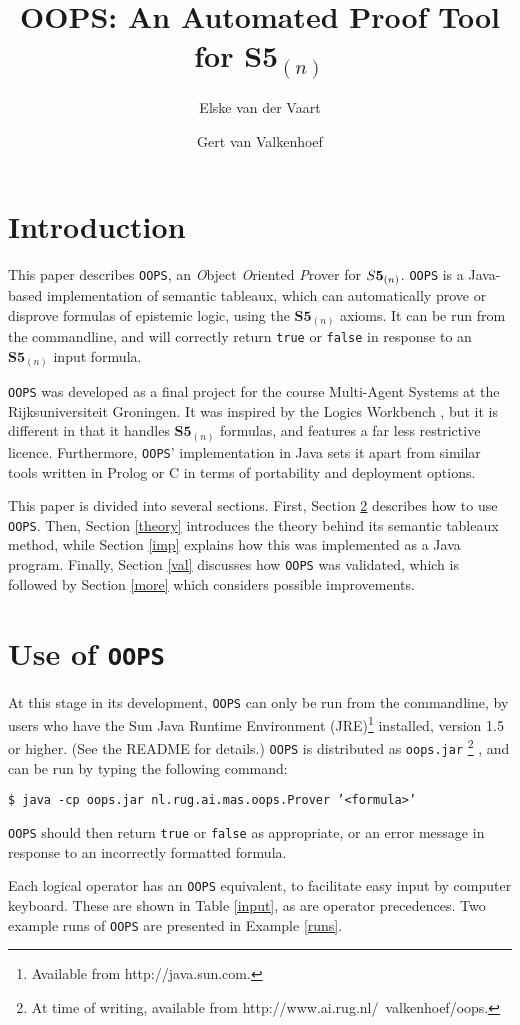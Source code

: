 \documentclass[11pt,a4paper]{article}
\author{Elske van der Vaart \and Gert van Valkenhoef}
\title{OOPS: An Automated Proof Tool for $\textbf{S5}_{(n)}$}
\begin{document}
\maketitle

\section{Introduction}

This paper describes {\tt OOPS}, an {\it O}bject {\it O}riented {\it P}rover for $\mathbf\mathit{S}\textbf{5}_{(n)}$. {\tt OOPS} is a Java-based implementation of semantic tableaux, which can automatically prove or disprove  formulas of epistemic logic, using the $\textbf{S5}_{(n)}$ axioms. It can be run from the commandline, and will correctly return {\tt true} or {\tt false} in response to an $\textbf{S5}_{(n)}$ input formula.
\par {\tt OOPS} was developed as a final project for the course Multi-Agent Systems at the Rijksuniversiteit Groningen. It was inspired by the Logics Workbench \cite{wb}, but it is different in that it handles $\textbf{S5}_{(n)}$ formulas, and features a far less restrictive licence.
Furthermore, {\tt OOPS}' implementation in Java sets it apart from similar tools written in Prolog or C in terms of portability and deployment options.
\par This paper is divided into several sections. First, Section \ref{use} describes how to use {\tt OOPS}. Then, Section \ref{theory} introduces the theory behind its semantic tableaux method, while Section \ref {imp} explains how this was implemented as a Java program. Finally, Section \ref{val} discusses how {\tt OOPS} was validated, which is followed by Section \ref{more} which considers possible improvements.

\section{Use of {\tt OOPS}}
\label{use}
At this stage in its development, {\tt OOPS} can only be run from the commandline, by users who have the Sun Java Runtime Environment (JRE)\footnote{Available from http://java.sun.com.} installed, version 1.5 or higher. (See the README for details.)  {\tt OOPS} is distributed as {\tt oops.jar} \footnote{At time of writing, available from http://www.ai.rug.nl/~valkenhoef/oops.} , and can be run by typing the following command: \newline
\par {\tt \$ java -cp oops.jar nl.rug.ai.mas.oops.Prover '<formula>'} \newline
\par {\tt OOPS} should then return {\tt true} or {\tt false} as appropriate, or an error message in response to an incorrectly formatted formula.
\par Each logical operator has an {\tt OOPS} equivalent, to facilitate easy input by computer keyboard. These are shown in Table \ref{input}, as are operator precedences. Two example runs of {\tt OOPS} are presented in Example \ref{runs}.
\end{document}
